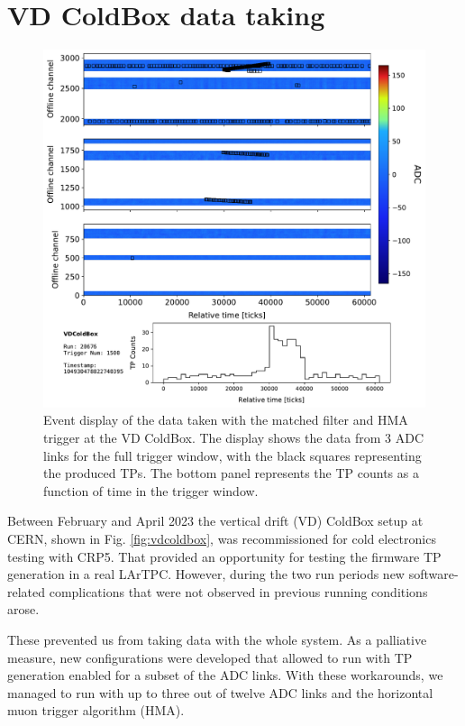 \section{VD ColdBox data taking}
\label{sec:matched_filter_vdcoldbox}

\begin{figure}[t]
    \centering
    \includegraphics[scale = 0.5]{Images/Matched_Filter/TRDisplay_np02_coldbox_run020676_0001.pdf}
    \caption[Event display of the data taken with the matched filter and HMA trigger at the VD ColdBox.]{Event display of the data taken with the matched filter and HMA trigger at the VD ColdBox. The display shows the data from 3 ADC links for the full trigger window, with the black squares representing the produced TPs. The bottom panel represents the TP counts as a function of time in the trigger window.}
    \label{fig:example_hma_evd}
\end{figure}

Between February and April 2023 the vertical drift (VD) ColdBox setup at CERN, shown in Fig. \ref{fig:vdcoldbox}, was recommissioned for cold electronics testing with CRP5. That provided an opportunity for testing the firmware TP generation in a real LArTPC. However, during the two run periods new software-related complications that were not observed in previous running conditions arose.

These prevented us from taking data with the whole system. As a palliative measure, new configurations were developed that allowed to run with TP generation enabled for a subset of the ADC links. With these workarounds, we managed to run with up to three out of twelve ADC links and the horizontal muon trigger algorithm (HMA).

